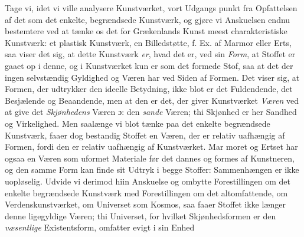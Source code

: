 \documentclass[12pt,a4paper]{book}
\begin{document}
Tage vi, idet vi ville analysere Kunstværket, vort Udgangs\-%
punkt fra Opfattelsen af det som det enkelte, begrændsede
Kunstværk, og gjøre vi Anskuelsen endnu bestemtere ved at
tænke os det for Grækenlands Kunst meest charakteristiske
Kunstværk: et plastisk Kunstværk, en Billedstøtte, f. Ex. af
Marmor eller Erts, saa viser det sig, at dette Kunstværk \emph{er},
hvad det er, ved sin \emph{Form}, at Stoffet er gaaet op i denne,
og i Kunstværket kun er som det formede Stof, saa at det
der ingen selvstændig Gyldighed og Væren har ved Siden af
Formen. Det viser sig, at Formen, der udtrykker den ideelle
Betydning, ikke blot er det Fuldendende, det Besjælende og
Beaandende, men at den er det, der giver Kunstværket \emph{Væren}
ved at give det \emph{Skjønhedens} Væren ɔ: den \emph{sande} Væren;
thi Skjønhed er her Sandhed og Virkelighed. Men saalænge
vi blot tænke paa det enkelte begrændsede Kunstværk, faaer
dog bestandig Stoffet en Væren, der er relativ uafhængig af
Formen, fordi den er relativ uafhængig af Kunstværket. Mar\-%
moret og Ertset har ogsaa en Væren som uformet Materiale
før det dannes og formes af Kunstneren, og den samme Form
kan finde sit Udtryk i begge Stoffer: Sammenhængen er ikke
uopløselig. Udvide vi derimod hiin Anskuelse og ombytte
Forestillingen om det enkelte begrændsede Kunstværk med
Forestillingen om det altomfattende, om Verdenskunstværket,
om Universet som Kosmos, saa faaer Stoffet ikke længer denne
ligegyldige Væren; thi Universet, for hvilket Skjønhedsformen
er den \emph{væsentlige} Existentsform, omfatter evigt i sin Enhed
\end{document}
